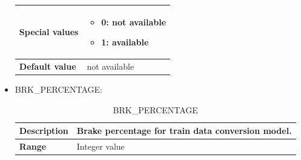 \documentclass{template/openetcs}
\begin{document}
\begin{itemize}
\begin{longtable}{|l|l|}
				\hline
																																									
					\begin{minipage}[t]{0.22\linewidth} \textbf{Special values}	\end{minipage} 
				&	\begin{minipage}[t]{0.78\linewidth} \begin{itemize} \item 0: not available \item 1: available \end{itemize} \end{minipage} \\
				
				\hline
				
					\begin{minipage}[t]{0.22\linewidth} \textbf{Default value}	\end{minipage} 
				&	\begin{minipage}[t]{0.78\linewidth} not available \end{minipage} \\
				
				\hline
				
			\end{longtable}
			
		\item BRK\_PERCENTAGE:
													
			\begin{longtable}{|l|l|}
				\caption{BRK\_PERCENTAGE}\\ 
				\hline
				
					\begin{minipage}[t]{0.22\linewidth} \textbf{Description}	\end{minipage} 
				&	\begin{minipage}[t]{0.78\linewidth} Brake percentage for train data conversion model. \end{minipage} \\
				
				\hline
																																									
					\begin{minipage}[t]{0.22\linewidth} \textbf{Range}	\end{minipage} 
				&	\begin{minipage}[t]{0.78\linewidth} Integer value \end{minipage} \\
				
				\hline
				

\end{longtable}
\end{itemize}
\end{document}
